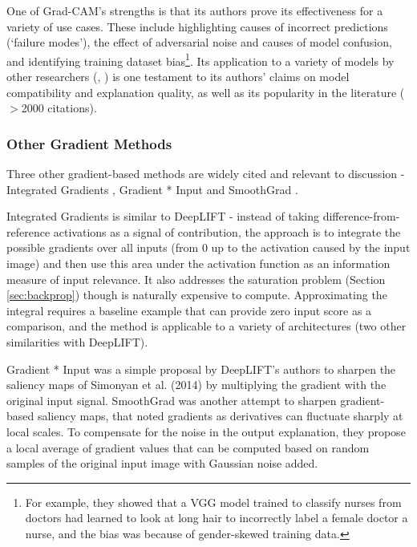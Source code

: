 \documentclass[main]{subfiles}
\begin{document}
One of Grad-CAM's strengths is that its authors prove its effectiveness for a variety of use cases. These include highlighting causes of incorrect predictions (`failure modes'), the effect of adversarial noise and causes of model confusion, and identifying training dataset bias\footnote{For example, they showed that a VGG model trained to classify nurses from doctors had learned to look at long hair to incorrectly label a female doctor a nurse, and the bias was because of gender-skewed training data.}. Its application to a variety of models by other researchers (\cite{gradcamplusplus}, \cite{xray}) is one testament to its authors' claims on model compatibility and explanation quality, as well as its popularity in the literature ($>$2000 citations). 



\subsubsection{Other Gradient Methods}

Three other gradient-based methods are widely cited and relevant to discussion - Integrated Gradients \cite{integrated}, Gradient * Input \cite{olddeeplift} and SmoothGrad \cite{smoothgrad}. 

Integrated Gradients is similar to DeepLIFT - instead of taking difference-from-reference activations as a signal of contribution, the approach is to integrate the possible gradients over all inputs (from 0 up to the activation caused by the input image) and then use this area under the activation function as an information measure of input relevance. It also addresses the saturation problem (Section \ref{sec:backprop}) though is naturally expensive to compute. Approximating the integral requires a baseline example that can provide zero input score as a comparison, and the method is applicable to a variety of architectures (two other similarities with DeepLIFT).

Gradient * Input was a simple proposal by DeepLIFT's authors to sharpen the saliency maps of Simonyan et al. (2014) \cite{saliencyII} by multiplying the gradient with the original input signal. SmoothGrad was another attempt to sharpen gradient-based saliency maps, that noted gradients as derivatives can fluctuate sharply at local scales. To compensate for the noise in the output explanation, they propose a local average of gradient values that can be computed based on random samples of the original input image with Gaussian noise added.
\end{document}
